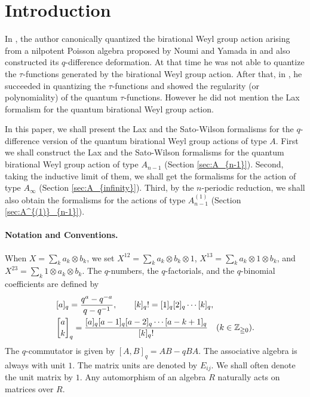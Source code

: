 \documentclass[12pt,twoside]{article}
\newcommand\ot{\otimes}
\newcommand\Z{{\mathbb Z}} %
\theoremstyle{plain} %
\theoremstyle{definition} %
\theoremstyle{definition} %
\numberwithin{theorem}{section}
\numberwithin{equation}{section}
\numberwithin{figure}{section}
\numberwithin{table}{section}
\newcommand\secref[1]{Section \ref{#1}}
\begin{document}
\title{\TITLE}
\author{\AUTHOR}
\date{\DATE}
\maketitle
\begin{abstract}
  \ABSTRACT
\end{abstract}
\tableofcontents
\setcounter{section}{-1} %

\section{Introduction}

In \cite{Kuroki2008}, 
the author canonically quantized 
the birational Weyl group action 
arising from a nilpotent Poisson algebra 
proposed by Noumi and Yamada in \cite{NY0012028}
and also constructed its $q$-difference deformation. 
At that time he was not able to quantize the $\tau$-functions 
generated by the birational Weyl group action.
After that, in \cite{Kuroki2012a}, he succeeded 
in quantizing the $\tau$-functions
and showed the regularity (or polynomiality) 
of the quantum $\tau$-functions.
However he did not mention the Lax formalism 
for the quantum birational Weyl group action.  

In this paper, we shall present the Lax and the Sato-Wilson formalisms
for the $q$-difference version of the quantum birational Weyl group actions
of type $A$.  
First we shall construct the Lax and the Sato-Wilson formalisms 
for the quantum birational Weyl group action of type $A_{n-1}$ 
(\secref{sec:A_{n-1}}).
Second, taking the inductive limit of them,
we shall get the formalisms for the action of type $A_\infty$
(\secref{sec:A_{infinity}}).  
Third, by the $n$-periodic reduction, we shall also obtain the formalisms 
for the actions of type $A^{(1)}_{n-1}$
(\secref{sec:A^{(1)}_{n-1}}).

\paragraph{Notation and Conventions.}
When $X = \sum_k a_k\ot b_k$, we set 
$X^{12}=\sum_k a_k\ot b_k\ot 1$, 
$X^{13}=\sum_k a_k\ot 1\ot b_k$, and
$X^{23}=\sum_k 1\ot a_k\ot b_k$.
The $q$-numbers, the $q$-factorials, and the $q$-binomial coefficients are defined by
\begin{align*}
 &
 [a]_q = \frac{q^a-q^{-a}}{q-q^{-1}}, \qquad
 [k]_q! = [1]_q[2]_q\cdots[k]_q, \quad
 \\ &
 \qbinom{a}{k}_q =
 \frac{[a]_q[a-1]_q[a-2]_q\cdots[a-k+1]_q}{[k]_q!}
 \quad  (k\in\Z_{\geqq0}).
\end{align*}
The $q$-commutator is given by $[A,B]_q=AB-qBA$.
The associative algebra is always with unit $1$. 
The matrix units are denoted by $E_{ij}$.
We shall often denote the unit matrix by $1$.
Any automorphism of an algebra $R$ naturally acts on matrices over $R$.
\end{document}
